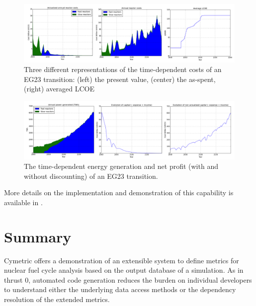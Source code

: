 \begin{figure}[htbp]
  \centering
  \includegraphics[width=\columnwidth]{./images/econ-eg23-1}
  \caption{Three different representations of the time-dependent costs of an
    EG23 transition: (left) the present value, (center) the as-spent, (right)
    averaged \gls{LCOE}}
  \label{fig:econ-eg23-1}
\end{figure}

\begin{figure}[htbp]
  \centering
  \includegraphics[width=\columnwidth]{./images/econ-eg23-2}
  \caption{The time-dependent energy generation and net profit (with and without
    discounting) of an EG23 transition.}
  \label{fig:econ-eg23-2}
\end{figure}


More details on the implementation and demonstration of this capability is
available in .  

\section{Summary}

Cymetric offers a demonstration of an extensible system to define metrics for
nuclear fuel cycle analysis based on the output database of a \Cyclus
simulation.  As in thrust 0, automated code generation reduces the burden on
individual developers to understand either the underlying data access methods
or the dependency resolution of the extended metrics.

